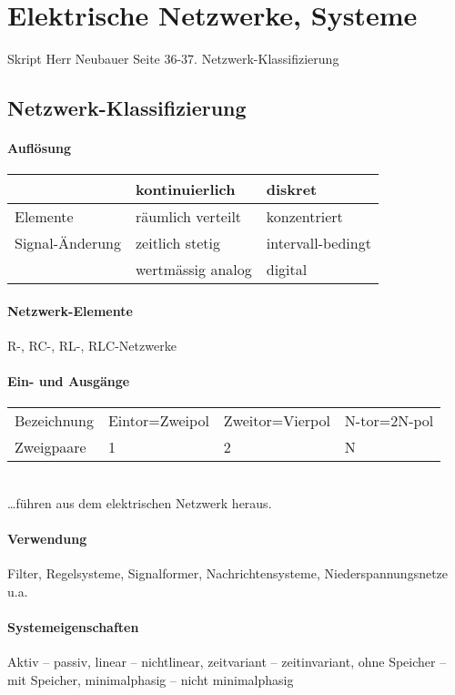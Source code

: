 \section{Elektrische Netzwerke, Systeme}
Skript Herr Neubauer Seite 36-37.
Netzwerk-Klassifizierung


\subsection{Netzwerk-Klassifizierung}
\paragraph{Auflösung}
\begin{tabular}{|l|l|l|}
	\hline
	& kontinuierlich & diskret \\
	\hline
	Elemente & räumlich verteilt & konzentriert \\
	\hline
	Signal-Änderung & zeitlich stetig & intervall-bedingt\\
	& wertmässig analog & digital\\
	\hline
\end{tabular}
\paragraph{Netzwerk-Elemente}
R-, RC-, RL-, RLC-Netzwerke
\paragraph{Ein- und Ausgänge}
\begin{tabular}{llll}
Bezeichnung & Eintor=Zweipol & Zweitor=Vierpol & N-tor=2N-pol \\
Zweigpaare & 1 & 2 & N\\
\end{tabular}\\
\ldots führen aus dem elektrischen Netzwerk heraus.
\paragraph{Verwendung}
Filter, Regelsysteme, Signalformer, Nachrichtensysteme, Niederspannungsnetze
u.a.
\paragraph{Systemeigenschaften}
Aktiv – passiv, linear – nichtlinear, zeitvariant – zeitinvariant,
ohne Speicher – mit Speicher, minimalphasig – nicht minimalphasig\\



